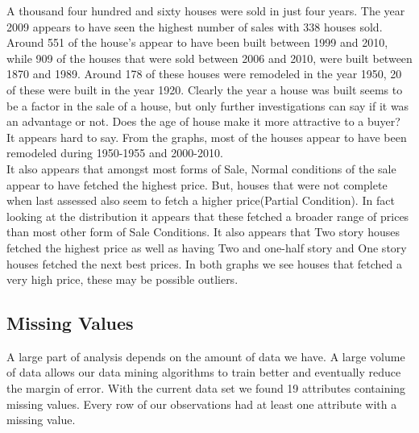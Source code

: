 \documentclass[fleqn,10pt]{SelfArx} %
\begin{document}
	A thousand four hundred and sixty houses were sold in just four years. The year 2009 appears to have seen the highest number of sales with 338 houses sold. Around 551 of the house's appear to have been built between 1999 and 2010, while 909 of the houses that were sold between 2006 and 2010,  were built between 1870 and 1989. Around 178 of these houses were remodeled in the year 1950, 20 of these were built in the year 1920. Clearly the year a house was built seems to be a factor in the sale of a house, but only further investigations can say if it was an advantage or not. Does the age of house make it more attractive to a buyer? It appears hard to say. From the graphs, most of the houses appear to have been remodeled during 1950-1955 and 2000-2010. \\
	
	It also appears that amongst most forms of Sale, Normal conditions of the sale appear to have fetched the highest price. But, houses that were not complete when last assessed also seem to fetch a higher price(Partial Condition). In fact looking at the distribution it appears that these fetched a broader range of prices than most other form of Sale Conditions. It also appears that Two story houses fetched the highest price as well as having Two and one-half story and One story houses fetched the next best prices. In both graphs we see houses that fetched a very high price, these may be possible outliers. 
	
	\subsection{Missing Values}
	A large part of analysis depends on the amount of data we have. A large volume of data allows our  data mining algorithms to train better and eventually reduce the margin of error. With the current data set we found 19 attributes containing missing values. Every row of our observations had at least one attribute with a missing value. 
	
\end{document}
